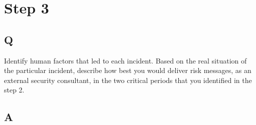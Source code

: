 \documentclass[uplatex]{jsarticle}
\begin{document}
\section*{Step 3}
\subsection*{Q}
Identify human factors that led to each incident. Based on the real situation of the particular incident, describe how best you would deliver risk messages, as an external security consultant, in the two critical periods that you identified in the step 2.
\subsection*{A}
\end{document}
